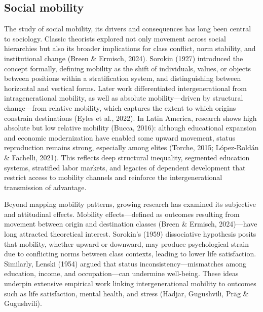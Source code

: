 \documentclass[
  12pt,
]{article}
\begin{document}
\subsection{Social mobility}\label{social-mobility}

The study of social mobility, its drivers and consequences has long been
central to sociology. Classic theorists explored not only movement
across social hierarchies but also its broader implications for class
conflict, norm stability, and institutional change (Breen \& Ermisch,
2024). Sorokin (1927) introduced the concept formally, defining mobility
as the shift of individuals, values, or objects between positions within
a stratification system, and distinguishing between horizontal and
vertical forms. Later work differentiated intergenerational from
intragenerational mobility, as well as absolute mobility---driven by
structural change---from relative mobility, which captures the extent to
which origins constrain destinations (Eyles et al., 2022). In Latin
America, research shows high absolute but low relative mobility (Bucca,
2016): although educational expansion and economic modernization have
enabled some upward movement, status reproduction remains strong,
especially among elites (Torche, 2015; López-Roldán \& Fachelli, 2021).
This reflects deep structural inequality, segmented education systems,
stratified labor markets, and legacies of dependent development that
restrict access to mobility channels and reinforce the intergenerational
transmission of advantage.

Beyond mapping mobility patterns, growing research has examined its
subjective and attitudinal effects. Mobility effects---defined as
outcomes resulting from movement between origin and destination classes
(Breen \& Ermisch, 2024)---have long attracted theoretical interest.
Sorokin's (1959) dissociative hypothesis posits that mobility, whether
upward or downward, may produce psychological strain due to conflicting
norms between class contexts, leading to lower life satisfaction.
Similarly, Lenski (1954) argued that status inconsistency---mismatches
among education, income, and occupation---can undermine well-being.
These ideas underpin extensive empirical work linking intergenerational
mobility to outcomes such as life satisfaction, mental health, and
stress (Hadjar, Gugushvili, Präg \& Gugushvili).
\end{document}
